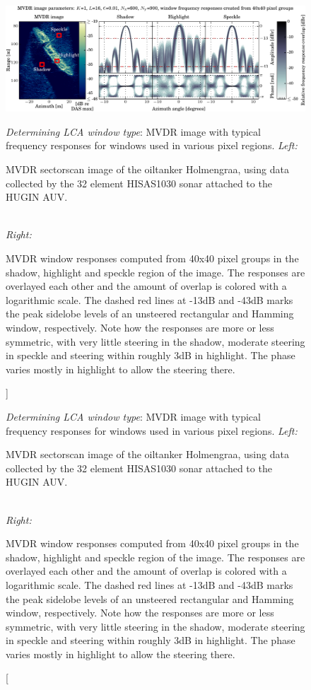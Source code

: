 \documentclass[10pt,journal,draftclsnofoot,onecolumn]{IEEEtran}
\let\MYoriglatexcaption\caption               %
\renewcommand{\caption}[2][\relax]{\MYoriglatexcaption[#2]{#2}}
\newcommand\1{\vec 1}
\begin{document}
\begin{figure}[t]\centering%
\includegraphics[width=\linewidth]{gfx/mvdr_selected_windows_holmengraa.pdf}%
\caption{\emph{Determining LCA window type}: MVDR image with typical frequency responses for windows used in various pixel regions.\newline
\emph{Left:}\hfill
\parbox[t]{.95\linewidth}{MVDR sectorscan image of the oiltanker Holmengraa, using data collected by the 32 element HISAS1030 sonar attached to the HUGIN AUV.}\protect\\\hspace{\textwidth}
\emph{Right:}\hfill
\parbox[t]{.95\linewidth}{MVDR window responses computed from 40x40 pixel groups in the shadow, highlight and speckle region of the image. The responses are overlayed each other and the amount of overlap is colored with a logarithmic scale. The dashed red lines at -13dB and -43dB marks the peak sidelobe levels of an unsteered rectangular and Hamming window, respectively. Note how the responses are more or less symmetric, with very little steering in the shadow, moderate steering in speckle and steering within roughly 3dB in highlight. The phase varies mostly in highlight to allow the steering there.} }\label{mvdr_selected_windows}
\end{figure}
\end{document}
